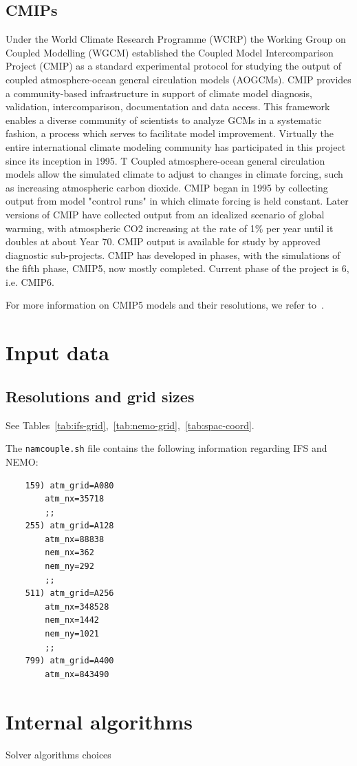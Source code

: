 \subsection{CMIPs}
Under the World Climate Research Programme (WCRP) the Working Group on Coupled Modelling (WGCM) established the Coupled Model Intercomparison Project (CMIP) as a standard experimental protocol for studying the output of coupled atmosphere-ocean general circulation models (AOGCMs). CMIP provides a community-based infrastructure in support of climate model diagnosis, validation, intercomparison, documentation and data access. This framework enables a diverse community of scientists to analyze GCMs in a systematic fashion, a process which serves to facilitate model improvement. Virtually the entire international climate modeling community has participated in this project since its inception in 1995. T
Coupled atmosphere-ocean general circulation models allow the simulated climate to adjust to changes in climate forcing, such as increasing atmospheric carbon dioxide. CMIP began in 1995 by collecting output from model "control runs" in which climate forcing is held constant. Later versions of CMIP have collected output from an idealized scenario of global warming, with atmospheric CO2 increasing at the rate of 1\% per year until it doubles at about Year 70. CMIP output is available for study by approved diagnostic sub-projects. 
CMIP has developed in phases, with the simulations of the fifth phase, CMIP5, now mostly completed. Current phase of the project is 6, i.e. CMIP6. 

For more information on CMIP5 models and their resolutions, we refer to~\cite{cmip5}.

\section{Input data}

\subsection{Resolutions and grid sizes}
See Tables~\ref{tab:ifs-grid},~\ref{tab:nemo-grid},~\ref{tab:spac-coord}.

The \texttt{namcouple.sh} file contains the following information regarding IFS and NEMO:

\begin{lstlisting}
    159) atm_grid=A080
        atm_nx=35718
        ;;
    255) atm_grid=A128
        atm_nx=88838
        nem_nx=362
        nem_ny=292
        ;;
    511) atm_grid=A256
        atm_nx=348528
        nem_nx=1442
        nem_ny=1021
        ;;
    799) atm_grid=A400
        atm_nx=843490  
\end{lstlisting}








\section{Internal algorithms}
Solver algorithms choices